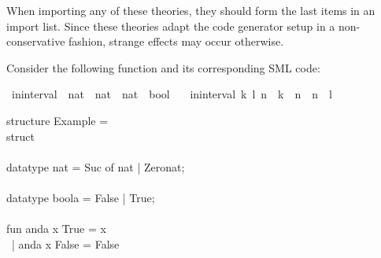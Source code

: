 \begin{isabellebody}
\begin{isamarkuptext}
  \begin{warn}
    When importing any of these theories, they should form the last
    items in an import list.  Since these theories adapt the
    code generator setup in a non-conservative fashion,
    strange effects may occur otherwise.
  \end{warn}%
\end{isamarkuptext}%
\isamarkuptrue%
%
\isamarkuptrue%
%
\begin{isamarkuptext}%
Consider the following function and its corresponding
  SML code:%
\end{isamarkuptext}%
\isamarkuptrue%
%
\isadelimquote
%
\endisadelimquote
%
\isatagquote
{}\isamarkupfalse%
\ in{\isacharunderscore}interval\ {\isacharcolon}{\isacharcolon}\ {\isachardoublequoteopen}nat\ {\isasymtimes}\ nat\ {\isasymRightarrow}\ nat\ {\isasymRightarrow}\ bool{\isachardoublequoteclose}\ \isanewline
\ \ {\isachardoublequoteopen}in{\isacharunderscore}interval\ {\isacharparenleft}k{\isacharcomma}\ l{\isacharparenright}\ n\ {\isasymlongleftrightarrow}\ k\ {\isasymle}\ n\ {\isasymand}\ n\ {\isasymle}\ l{\isachardoublequoteclose}%
\endisatagquote
{\isafoldquote}%
%
\isadelimquote
%
\endisadelimquote
%
\isadeliminvisible
%
\endisadeliminvisible
%
\isataginvisible
%
\endisataginvisible
{\isafoldinvisible}%
%
\isadeliminvisible
%
\endisadeliminvisible
%
\isadelimquote
%
\endisadelimquote
%
\isatagquote
%
\begin{isamarkuptext}%
\isatypewriter%
\noindent%
\hspace*{0pt}structure Example = \\
\hspace*{0pt}struct\\
\hspace*{0pt}\\
\hspace*{0pt}datatype nat = Suc of nat | Zero{}nat;\\
\hspace*{0pt}\\
\hspace*{0pt}datatype boola = False | True;\\
\hspace*{0pt}\\
\hspace*{0pt}fun anda x True = x\\
\hspace*{0pt} ~| anda x False = False\\

\end{isamarkuptext}
\end{isabellebody}
